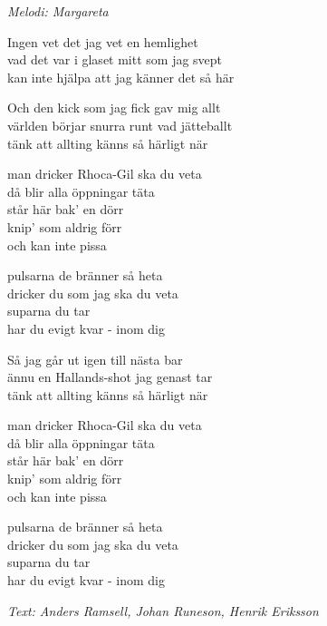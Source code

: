 {\footnotesize\textit{Melodi: Margareta}}\par
\vspace{10pt}
Ingen vet det jag vet en hemlighet\\
vad det var i glaset mitt som jag svept\\
kan inte hjälpa att jag känner det så här\par
\vspace{10pt}
Och den kick som jag fick gav mig allt\\
världen börjar snurra runt vad jätteballt\\
tänk att allting känns så härligt när\par
\vspace{10pt}
man dricker Rhoca-Gil ska du veta \\
då blir alla öppningar täta\\
står här bak' en dörr\\
knip' som aldrig förr\\
och kan inte pissa\par
\vspace{10pt}
pulsarna de bränner så heta\\
dricker du som jag ska du veta\\
suparna du tar\\
har du evigt kvar - inom dig\par
\vspace{10pt}
Så jag går ut igen till nästa bar\\
ännu en Hallands-shot jag genast tar\\
tänk att allting känns så härligt när\par
\vspace{10pt}
man dricker Rhoca-Gil ska du veta \\
då blir alla öppningar täta\\
står här bak' en dörr\\
knip' som aldrig förr\\
och kan inte pissa\par
\newpage
pulsarna de bränner så heta\\
dricker du som jag ska du veta\\
suparna du tar\\
har du evigt kvar - inom dig\par
\vspace{10pt}
{\footnotesize\textit{Text: Anders Ramsell, Johan Runeson, Henrik Eriksson}}
